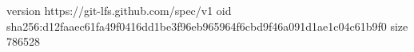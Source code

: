 version https://git-lfs.github.com/spec/v1
oid sha256:d12faaec61fa49f0416dd1be3f96eb965964f6cbd9f46a091d1ae1c04c61b9f0
size 786528
